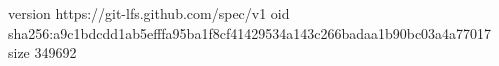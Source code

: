 version https://git-lfs.github.com/spec/v1
oid sha256:a9c1bdcdd1ab5efffa95ba1f8cf41429534a143c266badaa1b90bc03a4a77017
size 349692
